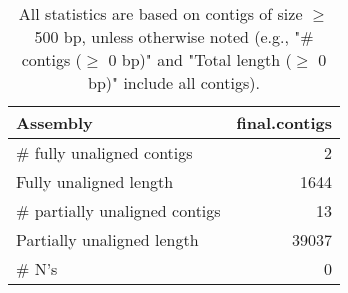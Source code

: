 \documentclass[12pt,a4paper]{article}
\begin{document}
\begin{table}[ht]
\begin{center}
\caption{All statistics are based on contigs of size $\geq$ 500 bp, unless otherwise noted (e.g., "\# contigs ($\geq$ 0 bp)" and "Total length ($\geq$ 0 bp)" include all contigs).}
\begin{tabular}{|l*{1}{|r}|}
\hline
Assembly & final.contigs \\ \hline
\# fully unaligned contigs & 2 \\ \hline
Fully unaligned length & 1644 \\ \hline
\# partially unaligned contigs & 13 \\ \hline
Partially unaligned length & 39037 \\ \hline
\# N's & 0 \\ \hline
\end{tabular}
\end{center}
\end{table}
\end{document}
